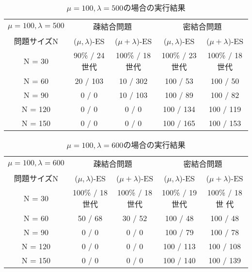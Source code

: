 \documentclass[a4j]{jarticle}
\begin{document}
\begin{table}[htb]
 \begin{center}
  \begin{tabular}[tb]{|c||c|c||c|c|} \hline
   $\mu = 100, \lambda = 500$& \multicolumn{2}{c||}{疎結合問題} &
   \multicolumn{2}{c|}{密結合問題} \\ \cline{2-5}
   問題サイズN& ($\mu, \lambda$)-ES& ($\mu + \lambda$)-ES& ($\mu, \lambda$)-ES&
   ($\mu + \lambda$)-ES \\ \hline \hline
   N = 30& 90\% / 24世代& 100\% / 18世代& 100\% / 23世代& 100\% / 18世代\\ \hline
   N = 60& 20 / 103& 10 / 302& 100 / 53& 100 / 50\\ \hline
   N = 90& 0 / 0& 10 / 103& 100 / 89& 100 / 82\\ \hline
   N = 120& 0 / 0& 0 / 0& 100 / 134& 100 / 119\\ \hline
   N = 150& 0 / 0& 0 / 0 & 100 / 165& 100 / 153\\ \hline
  \end{tabular}
  \caption{$\mu = 100, \lambda = 500$の場合の実行結果}
  \label{15}
 \end{center}
\end{table}

\begin{table}[htb]
 \begin{center}
  \begin{tabular}[tb]{|c||c|c||c|c|} \hline
   $\mu = 100, \lambda = 600$& \multicolumn{2}{c||}{疎結合問題} &
   \multicolumn{2}{c|}{密結合問題} \\ \cline{2-5}
   問題サイズN& ($\mu, \lambda$)-ES& ($\mu + \lambda$)-ES& ($\mu, \lambda$)-ES&
   ($\mu + \lambda$)-ES \\ \hline \hline
   N = 30& 100\% / 18世代& 100\% / 18世代& 100\% / 19世代& 100\% / 18世
   代\\ \hline
   N = 60& 50 / 68& 30 / 52& 100 / 48& 100 / 48\\ \hline
   N = 90& 0 / 0&0 / 0 & 100 / 79& 100 / 78\\ \hline
   N = 120& 0 / 0&0 / 0 & 100 / 113& 100 / 108\\ \hline
   N = 150& 0 / 0&0 / 0 & 100 / 140& 100 / 139\\ \hline
  \end{tabular}
  \caption{$\mu = 100, \lambda = 600$の場合の実行結果}
  \label{16}
 \end{center}
\end{table}
\end{document}
